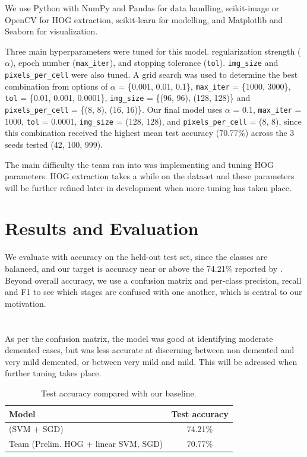 \documentclass[11pt]{article}
\begin{document}
We use Python with NumPy and Pandas for data handling, scikit-image or OpenCV for HOG extraction, scikit-learn for modelling, and Matplotlib and Seaborn for visualization.

Three main hyperparameters were tuned for this model. regularization strength ($\alpha$), epoch number (\texttt{max\_iter}), and stopping tolerance (\texttt{tol}). \texttt{img\_size} and \texttt{pixels\_per\_cell} were also tuned. A grid search was used to determine the best combination from options of $\alpha$ = \{0.001, 0.01, 0.1\}, \texttt{max\_iter} = \{1000, 3000\}, \texttt{tol} = \{0.01, 0.001, 0.0001\}, \texttt{img\_size} = \{(96, 96), (128, 128)\} and \texttt{pixels\_per\_cell} = \{(8, 8), (16, 16)\}. Our final model uses $\alpha$ = 0.1, \texttt{max\_iter} = 1000, \texttt{tol} = 0.0001, \texttt{img\_size} = (128, 128), and \texttt{pixels\_per\_cell} = (8, 8), since this combination received the highest mean test accuracy (\~70.77\%) across the 3 seeds tested (42, 100, 999).

The main difficulty the team ran into was implementing and tuning HOG parameters. HOG extraction takes a while on the dataset and these parameters will be further refined later in development when more tuning has taken place. 

\section{Results and Evaluation}
\label{sec:results}

We evaluate with accuracy on the held-out test set, since the classes are balanced, and our target is accuracy near or above the 74.21\% reported by \citet{vengala2024}. Beyond overall accuracy, we use a confusion matrix and per-class precision, recall and F1 to see which stages are confused with one another, which is central to our motivation.
\\
\\
\\
As per the confusion matrix, the model was good at identifying moderate demented cases, but was less accurate at discerning between non demented and very mild demented, or between very mild and mild. This will be adressed when further tuning takes place.



\begin{table}[h]
  \centering
  \begin{tabular}{lc}
    \hline
    \textbf{Model} & \textbf{Test accuracy} \\
    \hline
    \citet{vengala2024} (SVM + SGD) & 74.21\% \\
    Team (Prelim. HOG + linear SVM, SGD) & 70.77\% \\
    \hline
  \end{tabular}
  \caption{\label{tab:results} Test accuracy compared with our baseline.}
\end{table}
\end{document}
